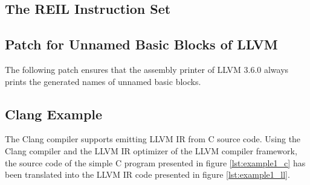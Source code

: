 
\clearpage


\subsection{The REIL Instruction Set}
\label{app:reil_instructions}



\clearpage


\subsection{Patch for Unnamed Basic Blocks of LLVM}
\label{app:unnamed_patch}

The following patch ensures that the assembly printer of LLVM 3.6.0 always prints the generated names of unnamed basic blocks.



\clearpage


\subsection{Clang Example}
\label{app:clang_example}

The Clang compiler supports emitting LLVM IR from C source code. Using the Clang compiler and the LLVM IR optimizer of the LLVM compiler framework, the source code of the simple C program presented in figure \ref{lst:example1_c} has been translated into the LLVM IR code presented in figure \ref{lst:example1_ll}.



